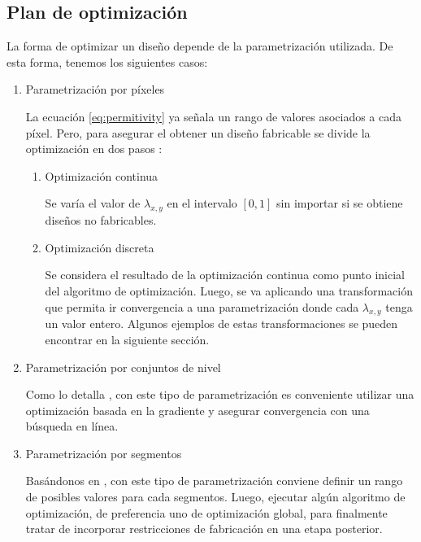 \subsection{Plan de optimización}

La forma de optimizar un diseño depende de la parametrización utilizada. De esta forma, tenemos los siguientes casos:

\begin{enumerate}


\item{Parametrización por píxeles}


La ecuación \ref{eq:permitivity} ya señala un rango de valores asociados a cada píxel. 
Pero, para asegurar el obtener un diseño fabricable se divide la optimización en dos pasos \citep{Su2020}:

  \begin{enumerate}
  \item Optimización continua
  
  Se varía el valor de $\lambda_{x,y}$ en el intervalo $[0, 1]$ sin importar si se obtiene diseños no fabricables.

  \item Optimización discreta

  Se considera el resultado de la optimización continua como punto inicial del algoritmo de optimización.
  Luego, se va aplicando una transformación que permita ir convergencia a una parametrización donde cada $\lambda_{x, y}$ tenga un valor entero.
  Algunos ejemplos de estas transformaciones se pueden encontrar en la siguiente sección.

  \end{enumerate}

\item{Parametrización por conjuntos de nivel}

Como lo detalla \cite{Piggott2017}, con este tipo de parametrización es conveniente utilizar una optimización basada en la gradiente y
asegurar convergencia con una búsqueda en línea.

\item{Parametrización por segmentos}

Basándonos en \cite{Prosopio-Galarza2019}, con este tipo de parametrización conviene definir un rango de posibles valores para cada segmentos.
Luego, ejecutar algún algoritmo de optimización, de preferencia uno de optimización global, para finalmente tratar de incorporar restricciones de fabricación en una etapa posterior.

\end{enumerate}

